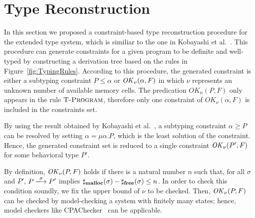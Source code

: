 \section{Type Reconstruction}\label{sec:reconstruction}
In this section we proposed a constraint-based type reconstruction
procedure for the extended type system, which is similiar to the one
in Kobayashi et al.~\cite{DBLP:journals/lmcs/KobayashiSW06}.  This
procedure can generate constraints for a given program to be definite
and well-typed by constructing a derivation tree based on the rules in
Figure~\ref{fig:TypingRules}. According to this procedure, the
generated constraint is either a subtyping constraint \(P \le \alpha
\) or \(\mathit{OK}_\nu(\alpha, F)\) in which \(\nu\) represents an unknown
number of available memory cells. The predication \(OK_n(P, F)\) only
appears in the rule \(\textsc{{T-Program}}\), therefore only one constraint of
\(OK_\nu(\alpha, F)\) is included in the constraints set.

By using the result obtained by Kobayashi et al.~\cite[Lemma
  3.8]{DBLP:journals/lmcs/KobayashiSW06}, a subtyping constraint
\(\alpha \ge P\) can be resolved by setting \(\alpha = \mu
\alpha. P\), which is the least solution of the constraint.  Hence,
the generated constraint set is reduced to a single constraint
\(\mathit{OK}_{\nu}(P', F)\) for some behavioral type \(P'\).

By definition, \(\mathit{OK}_{\nu}(P, F)\) holds if there is a natural number
\(n\) such that, for all \(\sigma\) and \(P'\), \(P
\xlongrightarrow{\sigma} P'\) implies \(\sharp_{\mathbf{malloc}}(\sigma) -
\sharp_{\mathbf{free}}(\sigma) \le n\).  In order to check this condition
soundly, we fix the upper bound of \(\nu\) to be checked.  Then,
\(\mathit{OK}_{\nu}(P, F)\) can be checked by model-checking a system with
finitely many states; hence, model checkers like
CPAChecker~\cite{beyer2011cpachecker} can be applicable.
